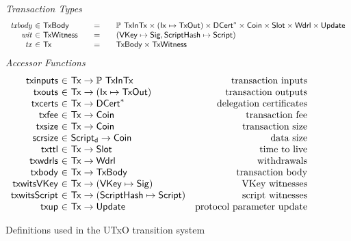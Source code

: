 \begin{figure*}[htb]
  \emph{Transaction Types}
  \begin{equation*}
    \begin{array}{r@{~\in~}l@{\qquad=\qquad}l}
      \var{txbody}
      & \TxBody
      & \powerset{\TxInTx} \times (\Ix \mapsto \TxOut) \times \seqof{\DCert}
        \times \Coin \times \Slot \times \Wdrl \times \Update
      \\
      \var{wit} & \TxWitness & (\VKey \mapsto \Sig, \HashScr \mapsto \Script)
      \\
      \var{tx}
      & \Tx
      & \TxBody \times \TxWitness
    \end{array}
  \end{equation*}
  \emph{Accessor Functions}
  \begin{equation*}
    \begin{array}{r@{~\in~}lr}
      \fun{txinputs} & \Tx \to \powerset{\TxInTx} & \text{transaction inputs} \\
      \fun{txouts} & \Tx \to (\Ix \mapsto \TxOut) & \text{transaction outputs} \\
      \fun{txcerts} & \Tx \to \seqof{\DCert} & \text{delegation certificates} \\
      \fun{txfee} & \Tx \to \Coin & \text{transaction fee} \\
      \fun{txsize} & \Tx \to \Coin & \text{transaction size} \\
      \fun{scrsize} & \ScriptD \to \Coin & \text{data size} \\
      \fun{txttl} & \Tx \to \Slot & \text{time to live} \\
      \fun{txwdrls} & \Tx \to \Wdrl & \text{withdrawals} \\
      \fun{txbody} & \Tx \to \TxBody & \text{transaction body}\\
      \fun{txwitsVKey} & \Tx \to (\VKey \mapsto \Sig) & \text{VKey witnesses} \\
      \fun{txwitsScript} & \Tx \to (\HashScr \mapsto \Script) & \text{script witnesses}\\
      \fun{txup} & \Tx \to \Update & \text{protocol parameter update}
    \end{array}
  \end{equation*}
  \caption{Definitions used in the UTxO transition system}
  \label{fig:defs:utxo-shelley-2}
\end{figure*}

